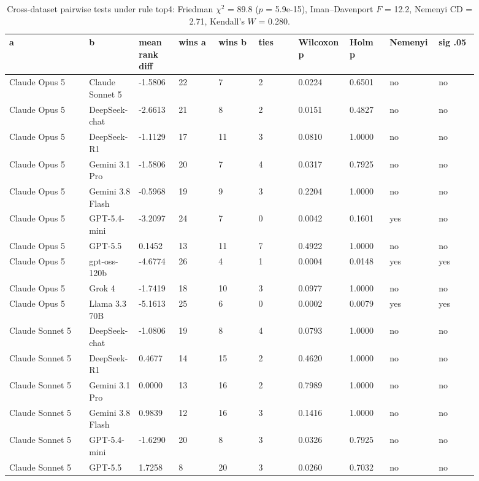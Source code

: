 \begin{landscape}
\tiny
\setlength{\tabcolsep}{3pt}
\begin{longtable}{p{0.162\linewidth}p{0.081\linewidth}p{0.081\linewidth}p{0.081\linewidth}p{0.081\linewidth}p{0.081\linewidth}p{0.081\linewidth}p{0.081\linewidth}p{0.081\linewidth}p{0.081\linewidth}}
\caption{Cross-dataset pairwise tests under rule top4: Friedman $\chi^2$ = 89.8 ($p$ = 5.9e-15), Iman--Davenport $F$ = 12.2, Nemenyi CD = 2.71, Kendall's $W$ = 0.280.}\label{tab:pairwise_top4}\\
\toprule
a & b & mean rank diff & wins a & wins b & ties & Wilcoxon p & Holm p & Nemenyi & sig .05 \\
\midrule
Claude Opus 5 & Claude Sonnet 5 & -1.5806 & 22 & 7 & 2 & 0.0224 & 0.6501 & no & no \\
Claude Opus 5 & DeepSeek-chat & -2.6613 & 21 & 8 & 2 & 0.0151 & 0.4827 & no & no \\
Claude Opus 5 & DeepSeek-R1 & -1.1129 & 17 & 11 & 3 & 0.0810 & 1.0000 & no & no \\
Claude Opus 5 & Gemini 3.1 Pro & -1.5806 & 20 & 7 & 4 & 0.0317 & 0.7925 & no & no \\
Claude Opus 5 & Gemini 3.8 Flash & -0.5968 & 19 & 9 & 3 & 0.2204 & 1.0000 & no & no \\
Claude Opus 5 & GPT-5.4-mini & -3.2097 & 24 & 7 & 0 & 0.0042 & 0.1601 & yes & no \\
Claude Opus 5 & GPT-5.5 & 0.1452 & 13 & 11 & 7 & 0.4922 & 1.0000 & no & no \\
Claude Opus 5 & gpt-oss-120b & -4.6774 & 26 & 4 & 1 & 0.0004 & 0.0148 & yes & yes \\
Claude Opus 5 & Grok 4 & -1.7419 & 18 & 10 & 3 & 0.0977 & 1.0000 & no & no \\
Claude Opus 5 & Llama 3.3 70B & -5.1613 & 25 & 6 & 0 & 0.0002 & 0.0079 & yes & yes \\
Claude Sonnet 5 & DeepSeek-chat & -1.0806 & 19 & 8 & 4 & 0.0793 & 1.0000 & no & no \\
Claude Sonnet 5 & DeepSeek-R1 & 0.4677 & 14 & 15 & 2 & 0.4620 & 1.0000 & no & no \\
Claude Sonnet 5 & Gemini 3.1 Pro & 0.0000 & 13 & 16 & 2 & 0.7989 & 1.0000 & no & no \\
Claude Sonnet 5 & Gemini 3.8 Flash & 0.9839 & 12 & 16 & 3 & 0.1416 & 1.0000 & no & no \\
Claude Sonnet 5 & GPT-5.4-mini & -1.6290 & 20 & 8 & 3 & 0.0326 & 0.7925 & no & no \\
Claude Sonnet 5 & GPT-5.5 & 1.7258 & 8 & 20 & 3 & 0.0260 & 0.7032 & no & no \\

\end{longtable}
\end{landscape}
